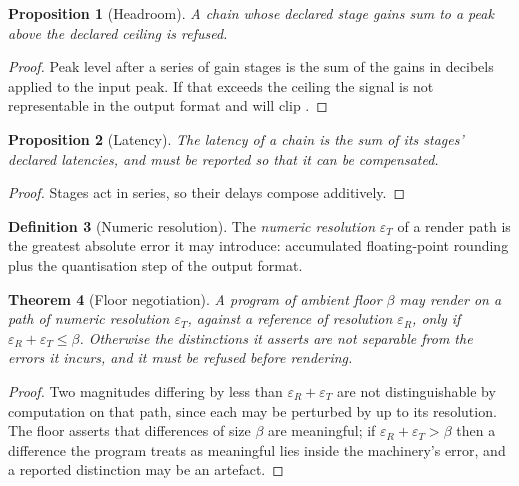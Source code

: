 \documentclass[11pt,twocolumn,a4paper]{article}
\newtheorem{theorem}{Theorem}[section]
\newtheorem{proposition}[theorem]{Proposition}
\theoremstyle{definition}
\newtheorem{definition}[theorem]{Definition}
\theoremstyle{remark}
\newcommand{\flo}{\beta}
\begin{document}
\begin{proposition}[Headroom]
\label{prop:headroom}
A chain whose declared stage gains sum to a peak above the declared ceiling is
refused.
\end{proposition}

\begin{proof}
Peak level after a series of gain stages is the sum of the gains in decibels
applied to the input peak. If that exceeds the ceiling the signal is not
representable in the output format and will clip
\citep{lund2006stop}.
\end{proof}

\begin{proposition}[Latency]
\label{prop:latency}
The latency of a chain is the sum of its stages' declared latencies, and must be
reported so that it can be compensated.
\end{proposition}

\begin{proof}
Stages act in series, so their delays compose additively.
\end{proof}

\begin{definition}[Numeric resolution]
\label{def:numres}
The \emph{numeric resolution} $\varepsilon_T$ of a render path is the greatest
absolute error it may introduce: accumulated floating-point rounding
\citep{goldberg1991what} plus the quantisation step of the output format.
\end{definition}

\begin{theorem}[Floor negotiation]
\label{thm:negotiate}
A program of ambient floor $\flo$ may render on a path of numeric resolution
$\varepsilon_T$, against a reference of resolution $\varepsilon_R$, only if
$\varepsilon_R+\varepsilon_T\le\flo$. Otherwise the distinctions it asserts are
not separable from the errors it incurs, and it must be refused before rendering.
\end{theorem}

\begin{proof}
Two magnitudes differing by less than $\varepsilon_R+\varepsilon_T$ are not
distinguishable by computation on that path, since each may be perturbed by up to
its resolution. The floor asserts that differences of size $\flo$ are meaningful;
if $\varepsilon_R+\varepsilon_T>\flo$ then a difference the program treats as
meaningful lies inside the machinery's error, and a reported distinction may be
an artefact.
\end{proof}
\end{document}
